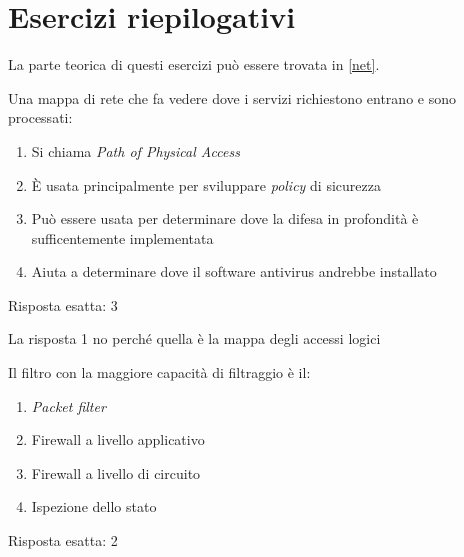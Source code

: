 \section{Esercizi riepilogativi}
\label{EsNetRiep}

La parte teorica di questi esercizi pu\`o essere trovata in \ref{net}.

\begin{Exercise} [
  title={Quiz},
  label={netriep1}
  ]

  \Question Una mappa di rete che fa vedere dove i servizi richiestono entrano
e sono processati:

\begin{enumerate}
 \item Si chiama \textit{Path of Physical Access}
 \item \`E usata principalmente per sviluppare \textit{policy} di sicurezza
 \item Pu\`o essere usata per determinare dove la difesa in profondit\`a \`e
sufficentemente implementata
 \item Aiuta a determinare dove il software antivirus andrebbe installato
\end{enumerate}

\end{Exercise}


\begin{Answer} [
  ref={netriep1},
  number={1}
  ]

  \Question Risposta esatta: 3

  La risposta 1 no perché quella è la mappa degli accessi logici

\end{Answer}



\begin{Exercise} [
  title={Quiz},
  label={netriep2}
  ]

  \Question Il filtro con la maggiore capacit\`a di filtraggio \`e il:
\begin{enumerate}
 \item \textit{Packet filter}
 \item Firewall a livello applicativo
 \item Firewall a livello di circuito
 \item Ispezione dello stato
\end{enumerate}

\end{Exercise}


\begin{Answer} [
  ref={netriep2},
  number={2}
  ]

  \Question Risposta esatta: 2

\end{Answer}

